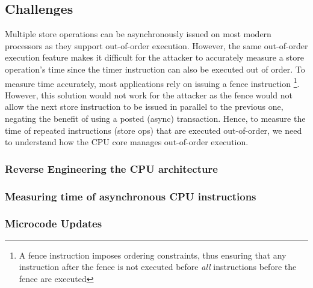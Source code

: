 \subsection{Challenges}
\label{subsec:interconnect-sc-store-ops-challenges}

Multiple store operations can be asynchronously issued on most modern processors as they support out-of-order execution. 
However, the same out-of-order execution feature makes it difficult for the attacker to accurately measure a store operation's time since the timer instruction can also be executed out of order.
To measure time accurately, most applications rely on issuing a fence instruction
\footnote{A fence instruction imposes ordering constraints, thus ensuring that any instruction after the fence is not executed before \textit{all} instructions before the fence are executed}.
However, this solution would not work for the attacker as the fence would not allow the next store instruction to be issued in parallel to the previous one, negating the benefit of using a posted (async) transaction.
Hence, to measure the time of repeated instructions (store ops) that are executed out-of-order, we need to understand how the CPU core manages out-of-order execution.

\subsubsection{Reverse Engineering the CPU architecture}
\label{subsubsec:interconnect-sc-store-ops-challenges-reverse-engineering}

\subsubsection{Measuring time of asynchronous CPU instructions}
\label{subsubsec:interconnect-sc-store-ops-challenges-measuring-time}

\subsubsection{Microcode Updates}
\label{subsubsec:interconnect-sc-store-ops-challenges-microcode-updates}